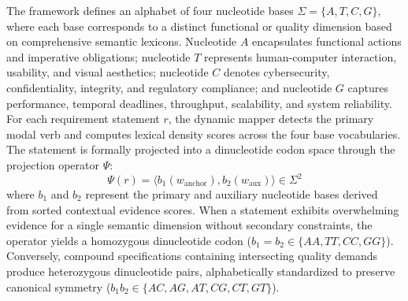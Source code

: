 The framework defines an alphabet of four nucleotide bases $\Sigma = \{A, T, C, G\}$, where each base corresponds to a distinct functional or quality dimension based on comprehensive semantic lexicons. Nucleotide $A$ encapsulates functional actions and imperative obligations; nucleotide $T$ represents human-computer interaction, usability, and visual aesthetics; nucleotide $C$ denotes cybersecurity, confidentiality, integrity, and regulatory compliance; and nucleotide $G$ captures performance, temporal deadlines, throughput, scalability, and system reliability. For each requirement statement $r$, the dynamic mapper detects the primary modal verb and computes lexical density scores across the four base vocabularies. The statement is formally projected into a dinucleotide codon space through the projection operator $\Psi$:
\begin{equation}
\Psi(r) = \langle b_1(w_{\text{anchor}}), b_2(w_{\text{aux}}) \rangle \in \Sigma^2
\end{equation}
where $b_1$ and $b_2$ represent the primary and auxiliary nucleotide bases derived from sorted contextual evidence scores. When a statement exhibits overwhelming evidence for a single semantic dimension without secondary constraints, the operator yields a homozygous dinucleotide codon ($b_1 = b_2 \in \{AA, TT, CC, GG\}$). Conversely, compound specifications containing intersecting quality demands produce heterozygous dinucleotide pairs, alphabetically standardized to preserve canonical symmetry ($b_1 b_2 \in \{AC, AG, AT, CG, CT, GT\}$).

